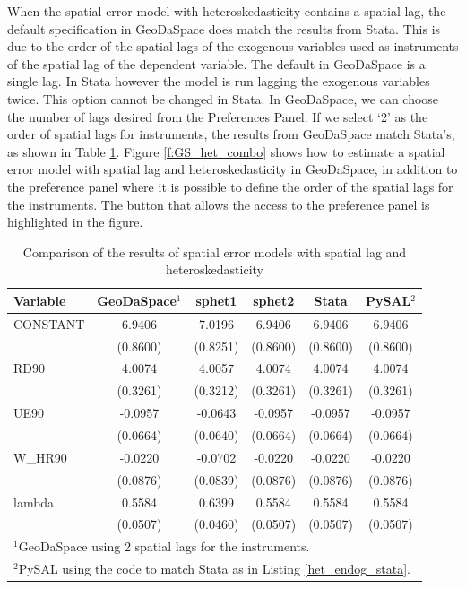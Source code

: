 \documentclass{article}
\begin{document}
When the spatial error model with heteroskedasticity contains a spatial lag, the default specification in GeoDaSpace does match the results from Stata. This is due to the order of the spatial lags of the exogenous variables used as instruments of the spatial lag of the dependent variable. The default in GeoDaSpace is a single lag. In Stata however the model is run lagging the exogenous variables twice. This option cannot be changed in Stata. In GeoDaSpace, we can choose the number of lags desired from the Preferences Panel. If we select `2' as the order of spatial lags for instruments, the results from GeoDaSpace match Stata's, as shown in Table \ref{t:res_het_combo}. Figure \ref{f:GS_het_combo} shows how to estimate a spatial error model with spatial lag and heteroskedasticity in GeoDaSpace, in addition to the preference panel where it is possible to define the order of the spatial lags for the instruments. The button that allows the access to the preference panel is highlighted in the figure.

\begin{table}[htpb]
\caption{Comparison of the results of spatial error models with spatial lag and heteroskedasticity}
\label{t:res_het_combo}
\centering
\begin{small}
\begin{tabular}{l|ccccc} \hline
\textbf{Variable}&\textbf{GeoDaSpace$^1$}&\textbf{sphet1}&\textbf{sphet2}&\textbf{Stata}&\textbf{PySAL$^2$}\\ \hline
CONSTANT&6.9406&7.0196&6.9406&6.9406&6.9406\\
&(0.8600)&(0.8251)&(0.8600)&(0.8600)&(0.8600)\\
RD90&4.0074&4.0057&4.0074&4.0074&4.0074\\
&(0.3261)&(0.3212)&(0.3261)&(0.3261)&(0.3261)\\
UE90&-0.0957&-0.0643&-0.0957&-0.0957&-0.0957\\
&(0.0664)&(0.0640)&(0.0664)&(0.0664)&(0.0664)\\
W\_HR90&-0.0220&-0.0702&-0.0220&-0.0220&-0.0220\\
&(0.0876)&(0.0839)&(0.0876)&(0.0876)&(0.0876)\\
lambda&0.5584&0.6399&0.5584&0.5584&0.5584\\
&(0.0507)&(0.0460)&(0.0507)&(0.0507)&(0.0507)\\
\hline
\multicolumn{6}{l}{\scriptsize{$^1$GeoDaSpace using 2 spatial lags for the instruments.}} \\
\multicolumn{6}{l}{\scriptsize{$^2$PySAL using the code to match Stata as in Listing \ref{het_endog_stata}.}} \\
\end{tabular}
\end{small}
\end{table}
\end{document}
